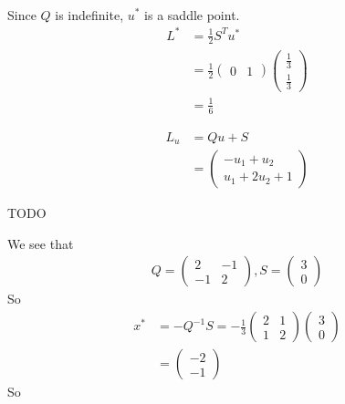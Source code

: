 \documentclass[12pt]{article}
\begin{document}
\begin{problem}[1.1.1]
\begin{enumerate}[label=(\alph*)]
\begin{align*}
\end{align*}
Since $ Q$ is indefinite,  $ u^* $ is a saddle point.
\begin{align*}
	L^* &= \frac{1}{2} S^{T} u^*  \\
	    &= \frac{1}{2} \begin{pmatrix} 0&1 \end{pmatrix} \begin{pmatrix} \frac{1}{3} \\ \frac{1}{3} \end{pmatrix}  \\
	    &= \frac{1}{6} 
\end{align*}

\begin{align*}
	L_u &= Qu + S \\
	&= \begin{pmatrix} -u_1+u_2\\u_1+2u_2+1 \end{pmatrix} 
\end{align*}
\end{enumerate}

TODO
\end{problem}
\begin{problem}[1.1.2]
We see that
\begin{align*}
Q= \begin{pmatrix} 2&-1\\-1&2 \end{pmatrix}, S= \begin{pmatrix} 3\\0 \end{pmatrix} 
\end{align*}
So
\begin{align*}
	x^* &= -Q^{-1}S = - \frac{1}{3} \begin{pmatrix} 2&1\\1&2 \end{pmatrix} \begin{pmatrix} 3\\0 \end{pmatrix}  \\
	&= \begin{pmatrix} -2\\-1 \end{pmatrix}   
\end{align*}
So 


\end{problem}
\end{document}

